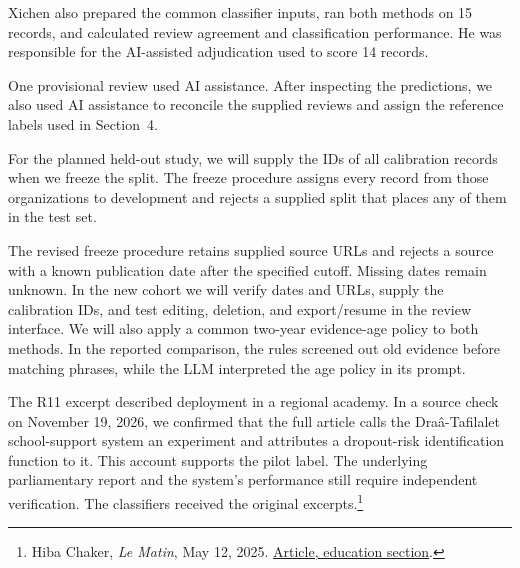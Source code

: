 
Xichen also prepared the common classifier inputs, ran both methods on 15
records, and calculated review agreement and classification performance.
He was responsible for the AI-assisted adjudication used to score 14 records.

One provisional review used AI assistance. After inspecting the predictions,
we also used AI assistance to reconcile the supplied reviews and assign the
reference labels used in Section~4.

For the planned held-out study, we will supply the IDs of all calibration
records when we freeze the split. The freeze procedure assigns every record
from those organizations to development and rejects a supplied split that
places any of them in the test set.

The revised freeze procedure retains supplied source URLs and rejects a
source with a known publication date after the specified cutoff. Missing
dates remain unknown. In the new cohort we will verify dates and URLs,
supply the calibration IDs, and test editing, deletion, and export/resume in
the review interface. We will also apply a common two-year evidence-age
policy to both methods. In the reported comparison, the rules screened out
old evidence before matching phrases, while the LLM interpreted the age
policy in its prompt.

The R11 excerpt described deployment in a regional academy. In a source
check on November 19, 2026, we confirmed that the full article calls the
Dra\^a-Tafilalet school-support system an experiment and attributes a
dropout-risk identification function to it. This account supports the pilot
label. The underlying parliamentary report and the system's performance
still require independent verification. The classifiers received the
original excerpts.\footnote{Hiba Chaker, \textit{Le Matin}, May 12, 2025.
\href{https://lematin.ma/nation/maroc-et-intelligence-artificielle-qui-pilote-la-machine/279065}{Article, education section}.}

